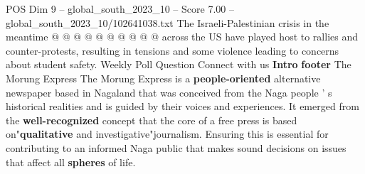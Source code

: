 \begin{textsample}{POS Dim 9 – global\_south\_2023\_10 – Score 7.00 – global\_south\_2023\_10/102641038.txt}
The Israeli-Palestinian crisis in the meantime @ @ @ @ @ @ @ @ @ @ across the US have played host to rallies and counter-protests, resulting in tensions and some violence leading to concerns about student safety.
Weekly Poll Question Connect with us \textbf{Intro} \textbf{footer} The Morung Express The Morung Express is a \textbf{people-oriented} alternative newspaper based in Nagaland that was conceived from the Naga people ' s historical realities and is guided by their voices and experiences.
It emerged from the \textbf{well-recognized} concept that the core of a free press is based on"\textbf{qualitative} and investigative"journalism.
Ensuring this is essential for contributing to an informed Naga public that makes sound decisions on issues that affect all \textbf{spheres} of life.

\end{textsample}
